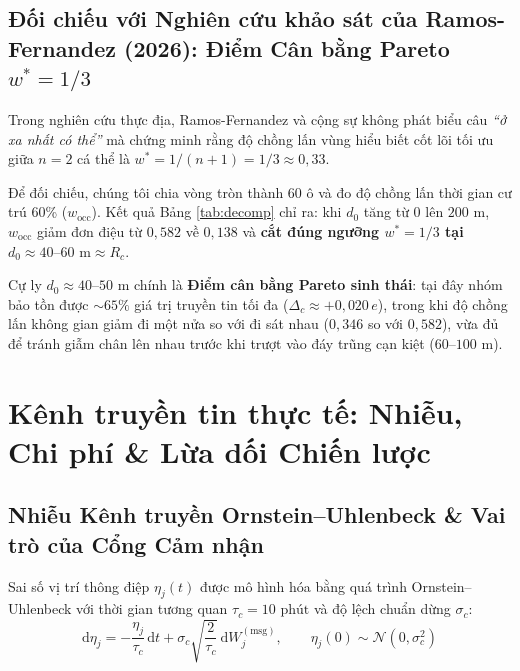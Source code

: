 \documentclass[11pt,a4paper]{report}
\newcommand{\dd}{\mathrm{d}}
\begin{document}
\section{Đối chiếu với Nghiên cứu khảo sát của Ramos-Fernandez (2026): Điểm Cân bằng Pareto \texorpdfstring{$w^* = 1/3$}{w* = 1/3}}
\begin{thucte}
Trong nghiên cứu thực địa, Ramos-Fernandez và cộng sự \cite{ramos} không phát biểu câu \textit{“ở xa nhất có thể”} mà chứng minh rằng độ chồng lấn vùng hiểu biết cốt lõi tối ưu giữa $n=2$ cá thể là $w^* = 1/(n+1) = 1/3 \approx 0{,}33$.

Để đối chiếu, chúng tôi chia vòng tròn thành 60 ô và đo độ chồng lấn thời gian cư trú 60\% ($w_{\text{occ}}$). Kết quả Bảng \ref{tab:decomp} chỉ ra: khi $d_0$ tăng từ $0$ lên $200\text{ m}$, $w_{\text{occ}}$ giảm đơn điệu từ $0{,}582$ về $0{,}138$ và \textbf{cắt đúng ngưỡng $w^* = 1/3$ tại $d_0 \approx 40\text{--}60\text{ m} \approx R_c$}. 

Cự ly $d_0 \approx 40\text{--}50\text{ m}$ chính là \textbf{Điểm cân bằng Pareto sinh thái}: tại đây nhóm bảo tồn được $\sim 65\%$ giá trị truyền tin tối đa ($\Delta_c \approx +0{,}020\,e$), trong khi độ chồng lấn không gian giảm đi một nửa so với đi sát nhau ($0{,}346$ so với $0{,}582$), vừa đủ để tránh giẫm chân lên nhau trước khi trượt vào đáy trũng cạn kiệt ($60\text{--}100\text{ m}$).
\end{thucte}

\FloatBarrier
\chapter{Kênh truyền tin thực tế: Nhiễu, Chi phí \& Lừa dối Chiến lược}

\section{Nhiễu Kênh truyền Ornstein--Uhlenbeck \& Vai trò của Cổng Cảm nhận}
Sai số vị trí thông điệp $\eta_j(t)$ được mô hình hóa bằng quá trình Ornstein--Uhlenbeck với thời gian tương quan $\tau_c = 10\text{ phút}$ và độ lệch chuẩn dừng $\sigma_c$:
\begin{equation}
\dd\eta_j = -\frac{\eta_j}{\tau_c}\,\dd t + \sigma_c\sqrt{\frac{2}{\tau_c}}\,\dd W_j^{(\text{msg})}, \qquad \eta_j(0) \sim \mathcal{N}(0, \sigma_c^2)
\end{equation}
\end{document}
